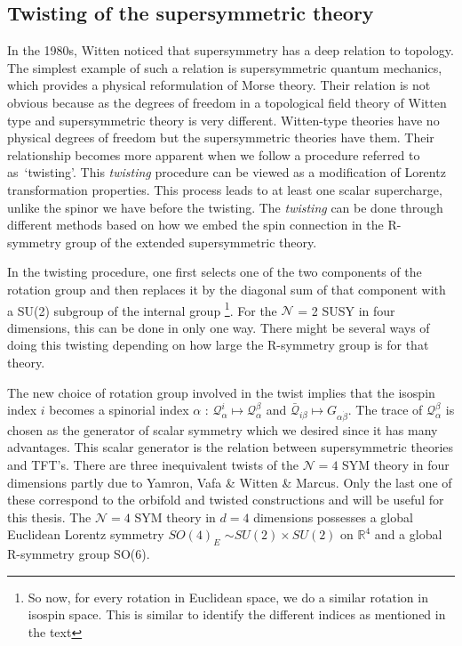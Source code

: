 \subsection{Twisting of the supersymmetric theory}
In the 1980s, Witten noticed that supersymmetry has a deep relation to topology. 
The simplest example of such a relation is supersymmetric quantum mechanics, 
which provides a physical reformulation of Morse theory. 
Their relation is not obvious because as the degrees of freedom in a topological field theory of 
Witten type and supersymmetric theory is very different. 
Witten-type theories have no physical degrees of freedom but the supersymmetric theories have them. 
Their relationship becomes more apparent when we follow a procedure referred to as~`twisting'. 
This \textit{twisting} procedure can be viewed as a modification of Lorentz transformation properties. 
This process leads to at least one scalar supercharge, unlike the spinor we have before the twisting. 
The \textit{twisting} can be done through different methods based on how we embed the spin connection 
in the R-symmetry group of the extended supersymmetric theory. 

In the twisting procedure, one first selects one of the two components of the rotation group and 
then replaces it by the diagonal sum of that component with a SU(2) subgroup of the internal group 
\footnote{So now, for every rotation in Euclidean space, we do a similar rotation in isospin space. 
This is similar to identify the different indices as mentioned in the text}. For the $\mathcal{N}$ = 2 
SUSY in four dimensions, this can be done in only one way. There might be several ways of doing
this twisting depending on how large the R-symmetry group is for that theory.

The new choice of rotation group involved in the twist implies that the isospin index $\textit{i}$ 
becomes a spinorial index $\alpha$ : $ \mathcal{Q}^{i}_{\alpha} \mapsto \mathcal{Q}^{\beta}_{\alpha}$ 
and $\bar{\mathcal{Q}}_{i \beta} \mapsto G_{\alpha\dot{\beta}}$. The trace of $ \mathcal{Q}^{\beta}_{\alpha}$ 
is chosen as the generator of scalar symmetry which we desired since it has many advantages. 
This scalar generator is the relation between supersymmetric theories and TFT's. There are three
 inequivalent twists of the $\mathcal{N}=4$ SYM theory in four dimensions partly due to Yamron, 
 Vafa \& Witten  \& Marcus. Only the last one of these correspond to the orbifold and twisted constructions 
 and will be useful for this thesis. The $\mathcal{N}=4$ SYM theory in $d=4$ dimensions possesses a 
 global Euclidean Lorentz symmetry 
$SO(4)_{E}$ $\sim SU(2) \times SU(2) $ on $\mathbb{R}^{4}$ and a global R-symmetry group SO(6). 

